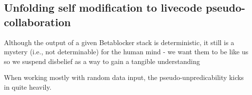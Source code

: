 \documentclass[letterpaper, 12pt]{article}
\begin{document}
\subsection{Unfolding self modification to livecode pseudo-collaboration} 
\label{sec:unfolding_self_modification_to_livecode_collaboration}

Although the output of a given Betablocker stack is deterministic, it still is a mystery (i.e., not determinable) for the human mind - we want them to be like us so we suspend disbelief as a way to gain a tangible understanding

When working mostly with random data input, the pseudo-unpredicability kicks in quite heavily. 


% 
\end{document}
